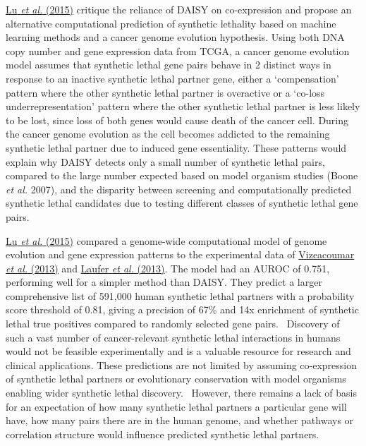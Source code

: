 \hyperlink{ENREF74}{Lu}\hyperlink{ENREF74}{\textit{ et
al.}}\hyperlink{ENREF74}{ (2015)} critique the reliance of DAISY on
co-expression and propose an alternative computational prediction of
synthetic lethality based on machine learning methods and a cancer
genome evolution hypothesis. Using both DNA copy number and gene
expression data from TCGA, a cancer genome evolution model assumes that
synthetic lethal gene pairs behave in 2 distinct ways in response to an
inactive synthetic lethal partner gene, either a
{\textquoteleft}compensation{\textquoteright} pattern where the other
synthetic lethal partner is overactive or a {\textquoteleft}co-loss
underrepresentation{\textquoteright} pattern where the other synthetic
lethal partner is less likely to be lost, since loss of both genes
would cause death of the cancer cell. During the cancer genome
evolution as the cell becomes addicted to the remaining synthetic
lethal partner due to induced gene essentiality. These patterns would
explain why DAISY detects only a small number of synthetic lethal
pairs, compared to the large number expected based on model organism
studies (Boone\textit{ et al.} 2007), and the disparity between
screening and computationally predicted synthetic lethal candidates due
to testing different classes of synthetic lethal gene pairs.


\hyperlink{ENREF74}{Lu}\hyperlink{ENREF74}{\textit{ et
al.}}\hyperlink{ENREF74}{ (2015)} compared a genome-wide computational
model of genome evolution and gene expression patterns to the
experimental data of
\hyperlink{ENREF108}{Vizeacoumar}\hyperlink{ENREF108}{\textit{ et
al.}}\hyperlink{ENREF108}{ (2013)} and
\hyperlink{ENREF60}{Laufer}\hyperlink{ENREF60}{\textit{ et
al.}}\hyperlink{ENREF60}{ (2013)}. The model had an AUROC of 0.751,
performing well for a simpler method than DAISY. They predict a
larger comprehensive list of 591,000 human synthetic lethal partners
with a probability score threshold of 0.81, giving a precision of 67\%
and 14x enrichment of synthetic lethal true positives compared to
randomly selected gene pairs. \ Discovery of such a vast number of
cancer-relevant synthetic lethal interactions in humans would not be
feasible experimentally and is a valuable resource for research and
clinical applications. These predictions are not limited by assuming
co-expression of synthetic lethal partners or evolutionary conservation
with model organisms enabling wider synthetic lethal discovery.
\ However, there remains a lack of basis for an expectation of how many
synthetic lethal partners a particular gene will have, how many pairs
there are in the human genome, and whether pathways or correlation
structure would influence predicted synthetic lethal partners.


